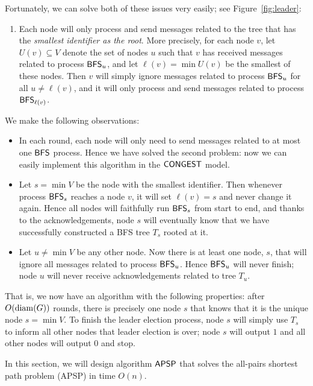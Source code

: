 Fortunately, we can solve both of these issues very easily; see Figure~\ref{fig:leader}:
\begin{enumerate}[resume]
    \item Each node will only process and send messages related to the tree that has the \emph{smallest identifier as the root}. More precisely, for each node $v$, let $U(v) \subseteq V$ denote the set of nodes $u$ such that $v$ has received messages related to process $\textup{\sffamily BFS}_u$, and let $\ell(v) = \min U(v)$ be the smallest of these nodes. Then $v$ will simply ignore messages related to process $\textup{\sffamily BFS}_u$ for all $u \ne \ell(v)$, and it will only process and send messages related to process $\textup{\sffamily BFS}_{\ell(v)}$.
\end{enumerate}
We make the following observations:
\begin{itemize}
    \item In each round, each node will only need to send messages related to at most one $\textup{\sffamily BFS}$ process. Hence we have solved the second problem: now we can easily implement this algorithm in the $\textup{\sffamily CONGEST}$ model.
    \item Let $s = \min V$ be the node with the smallest identifier. Then whenever process $\textup{\sffamily BFS}_s$ reaches a node $v$, it will set $\ell(v) = s$ and never change it again. Hence all nodes will faithfully run $\textup{\sffamily BFS}_s$ from start to end, and thanks to the acknowledgements, node $s$ will eventually know that we have successfully constructed a BFS tree $T_s$ rooted at it.
    \item Let $u \ne \min V$ be any other node. Now there is at least one node, $s$, that will ignore all messages related to process $\textup{\sffamily BFS}_u$. Hence $\textup{\sffamily BFS}_u$ will never finish; node $u$ will never receive acknowledgements related to tree $T_u$.
\end{itemize}
That is, we now have an algorithm with the following properties: after $O(\operatorname{diam}(G))$ rounds, there is precisely one node $s$ that knows that it is the unique node $s = \min V$. To finish the leader election process, node $s$ will simply use $T_s$ to inform all other nodes that leader election is over; node $s$ will output $1$ and all other nodes will output $0$ and stop.


\label{sec:apsp}

In this section, we will design algorithm $\textup{\sffamily APSP}$ that solves the all-pairs shortest path problem (APSP) in time $O(n)$.

